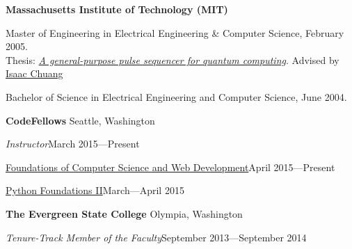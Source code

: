 \documentclass[letter]{article}
\begin{document}
{\bf Massachusetts Institute of Technology (MIT)}
\par
Master of Engineering in Electrical Engineering \& Computer Science, February 2005.\\
Thesis: \href{http://sourceforge.net/project/showfiles.php?group_id=129764&package_id=144780&release_id=307201}{\emph{A general-purpose pulse sequencer for quantum computing}}.
Advised by \href{http://feynman.mit.edu/ike/homepage/index.html}{Isaac Chuang}\\
\par
Bachelor of Science in Electrical Engineering and Computer Science, June 2004.\\
\vspace{\baselineskip}
\par


{\bf CodeFellows} \hfill Seattle, Washington
\vspace{0.5\baselineskip}
\par
{\em Instructor}\hfill March 2015---Present

\vspace{0.5\baselineskip}
\par
\href{https://www.codefellows.org/courses/foundations-1/computer-science-and-web-development}{Foundations of Computer Science and Web Development}\hfill April 2015---Present
\vspace{0.5\baselineskip}
\par
\href{https://www.codefellows.org/courses/foundations-2/python}{Python Foundations II}\hfill March---April 2015
\vspace{0.5\baselineskip}
\par

{\bf The Evergreen State College} \hfill Olympia, Washington
\vspace{0.5\baselineskip}
\par
{\em Tenure-Track Member of the Faculty}\hfill September 2013---September 2014
\end{document}

